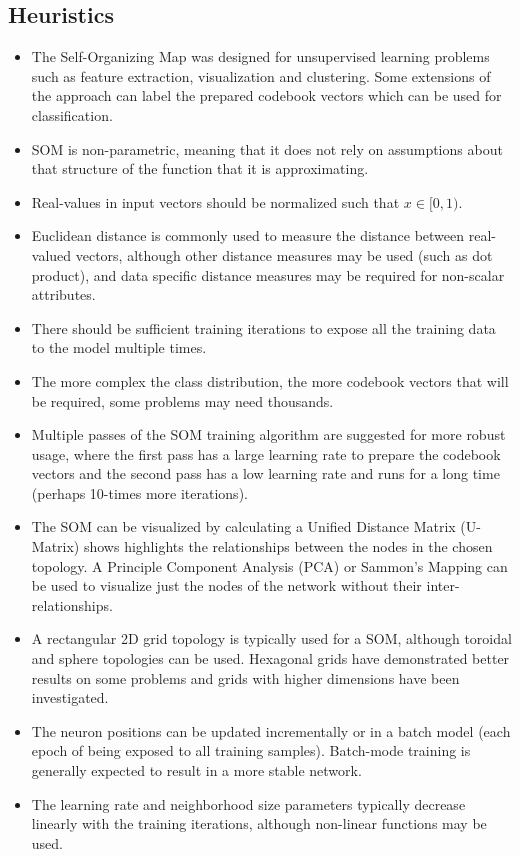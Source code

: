 \subsection{Heuristics}
\begin{itemize}
	\item The Self-Organizing Map was designed for unsupervised learning problems such as feature extraction, visualization and clustering. Some extensions of the approach can label the prepared codebook vectors which can be used for classification.
	\item SOM is non-parametric, meaning that it does not rely on assumptions about that structure of the function that it is approximating.
	\item Real-values in input vectors should be normalized such that $x \in [0,1)$. 
	\item Euclidean distance is commonly used to measure the distance between real-valued vectors, although other distance measures may be used (such as dot product), and data specific distance measures may be required for non-scalar attributes.
	\item There should be sufficient training iterations to expose all the training data to the model multiple times.
	\item The more complex the class distribution, the more codebook vectors that will be required, some problems may need thousands.
	\item Multiple passes of the SOM training algorithm are suggested for more robust usage, where the first pass has a large learning rate to prepare the codebook vectors and the second pass has a low learning rate and runs for a long time (perhaps 10-times more iterations).
	\item The SOM can be visualized by calculating a Unified Distance Matrix (U-Matrix) shows highlights the relationships between the nodes in the chosen topology. A Principle Component Analysis (PCA) or Sammon's Mapping can be used to visualize just the nodes of the network without their inter-relationships.
	\item A rectangular 2D grid topology is typically used for a SOM, although toroidal and sphere topologies can be used. Hexagonal grids have demonstrated better results on some problems and grids with higher dimensions have been investigated. 
	\item The neuron positions can be updated incrementally or in a batch model (each epoch of being exposed to all training samples). Batch-mode training is generally expected to result in a more stable network.
	\item The learning rate and neighborhood size parameters typically decrease linearly with the training iterations, although non-linear functions may be used.
\end{itemize}


